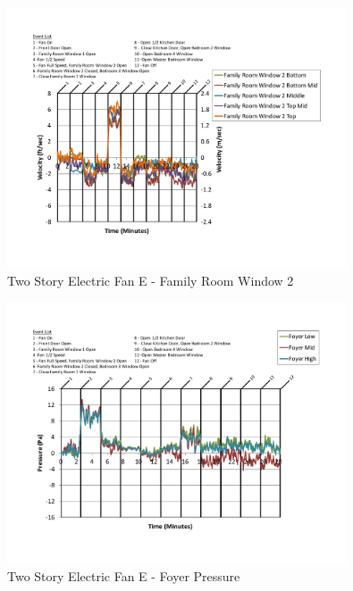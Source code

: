 \documentclass{article}
\begin{document}
\begin{appendices}
	\begin{figure}[H]
		\centering
		\includegraphics[height=3.05in,trim=0.67in 1.1in 0.67in 0.8in,clip=true]{0_Images/Results_Charts/ColdFlow/Two_Story/Electric/E/Family_Room_Window_2.pdf}
		\caption{Two Story Electric Fan E - Family Room Window 2}
	\end{figure}
 

	\begin{figure}[H]
		\centering
		\includegraphics[height=3.05in,trim=0.67in 1.1in 0.67in 0.8in,clip=true]{0_Images/Results_Charts/ColdFlow/Two_Story/Electric/E/Foyer_Pressure.pdf}
		\caption{Two Story Electric Fan E - Foyer Pressure}
	\end{figure}
 
	\clearpage


\end{appendices}
\end{document}
